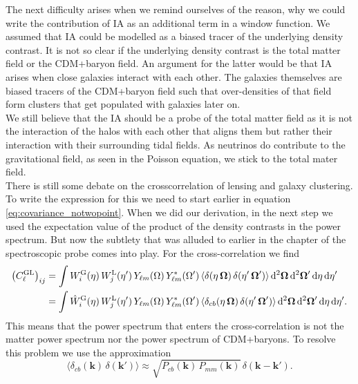 \documentclass[../main.tex]{subfiles}
\begin{document}
 The next difficulty arises when we remind ourselves of the reason, why we could write the contribution of IA as an additional term in a window function. We assumed that IA could be modelled as a biased tracer of the underlying density contrast. It is not so clear if the underlying density contrast is the total matter field or the CDM+baryon field. An argument for the latter would be that IA arises when close galaxies interact with each other. The galaxies themselves are biased tracers of the CDM+baryon field such that over-densities of that field form clusters that get populated with galaxies later on.\\
 We still believe that the IA should be a probe of the total matter field as it is not the interaction of the halos with each other that aligns them but rather their interaction with their surrounding tidal fields. As neutrinos do contribute to the gravitational field, as seen in the Poisson equation, we stick to the total mater field.\\
There is still some debate on the crosscorrelation of lensing and galaxy clustering. To write the expression for this we need to start earlier in equation \ref{eq:covariance_notwopoint}. When we did our derivation, in the next step we used the expectation value of the product of the density contrasts in the power spectrum. But now the subtlety that was alluded to earlier in the chapter of the spectroscopic probe comes into play. For the cross-correlation we find 
\begin{align}
    \left(C^\mathrm{GL}_{\ell}\right)_{ij}&= \int W_i^\mathrm{G}(\eta)\, W_j^\mathrm{L}(\eta')\, Y_{\ell m}(\Omega) \, Y^*_{\ell m}(\Omega')\, \langle \delta(\eta\,\boldsymbol{\Omega})\,\delta(\eta'\,\boldsymbol{\Omega}') \rangle\, \mathrm{d}^2 \boldsymbol{\Omega} \, \mathrm{d}^2 \boldsymbol{\Omega}' \,\mathrm{d} \eta\, \mathrm{d} \eta' \nonumber \\
    &= \int \hat{W}_i^\mathrm{G}(\eta)\, W_j^\mathrm{L}(\eta')\, Y_{\ell m}(\Omega) \, Y^*_{\ell m}(\Omega')\, \langle \delta_{cb}(\eta\,\boldsymbol{\Omega})\,\delta(\eta'\,\boldsymbol{\Omega}') \rangle\, \mathrm{d}^2 \boldsymbol{\Omega} \, \mathrm{d}^2 \boldsymbol{\Omega}' \,\mathrm{d} \eta\, \mathrm{d} \eta'.
\end{align} 
This means that the power spectrum that enters the cross-correlation is not the matter power spectrum nor the power spectrum of CDM+baryons. To resolve this problem we use the approximation \begin{equation}
    \langle \delta_{cb}(\boldsymbol{k})\,\delta(\boldsymbol{k}') \rangle \approx \sqrt{P_{cb}(\boldsymbol{k})\,P_{mm}(\boldsymbol{k})}\,\delta(\boldsymbol{k}-\boldsymbol{k}').
\end{equation}
\end{document}
